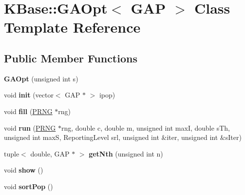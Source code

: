 \hypertarget{class_k_base_1_1_g_a_opt}{\section{K\-Base\-:\-:G\-A\-Opt$<$ G\-A\-P $>$ Class Template Reference}
\label{class_k_base_1_1_g_a_opt}
}
\subsection*{Public Member Functions}
\begin{DoxyCompactItemize}
\item 
\hypertarget{class_k_base_1_1_g_a_opt_a5f67a17ba318dd9a65c0a66c951fa1a2}{{\bfseries G\-A\-Opt} (unsigned int s)}\label{class_k_base_1_1_g_a_opt_a5f67a17ba318dd9a65c0a66c951fa1a2}

\item 
\hypertarget{class_k_base_1_1_g_a_opt_adcc44debffd7f234863719a1b4617130}{void {\bfseries init} (vector$<$ G\-A\-P $\ast$ $>$ ipop)}\label{class_k_base_1_1_g_a_opt_adcc44debffd7f234863719a1b4617130}

\item 
\hypertarget{class_k_base_1_1_g_a_opt_ad352dc1d49da8261c5a6928418a363c9}{void {\bfseries fill} (\hyperlink{class_k_base_1_1_p_r_n_g}{P\-R\-N\-G} $\ast$rng)}\label{class_k_base_1_1_g_a_opt_ad352dc1d49da8261c5a6928418a363c9}

\item 
\hypertarget{class_k_base_1_1_g_a_opt_a3b64c759cdcdf165e49aa3f5a271a434}{void {\bfseries run} (\hyperlink{class_k_base_1_1_p_r_n_g}{P\-R\-N\-G} $\ast$rng, double c, double m, unsigned int max\-I, double s\-Th, unsigned int max\-S, Reporting\-Level srl, unsigned int \&iter, unsigned int \&s\-Iter)}\label{class_k_base_1_1_g_a_opt_a3b64c759cdcdf165e49aa3f5a271a434}

\item 
\hypertarget{class_k_base_1_1_g_a_opt_a6e9ae733023e9b70878b1d4051d0ce56}{tuple$<$ double, G\-A\-P $\ast$ $>$ {\bfseries get\-Nth} (unsigned int n)}\label{class_k_base_1_1_g_a_opt_a6e9ae733023e9b70878b1d4051d0ce56}

\item 
\hypertarget{class_k_base_1_1_g_a_opt_ad7a00c54ac150ff23238f4daaaea7b98}{void {\bfseries show} ()}\label{class_k_base_1_1_g_a_opt_ad7a00c54ac150ff23238f4daaaea7b98}

\item 
\hypertarget{class_k_base_1_1_g_a_opt_aaee74f8e07ff31a763a55d0f7f8a3356}{void {\bfseries sort\-Pop} ()}\label{class_k_base_1_1_g_a_opt_aaee74f8e07ff31a763a55d0f7f8a3356}

\end{DoxyCompactItemize}
